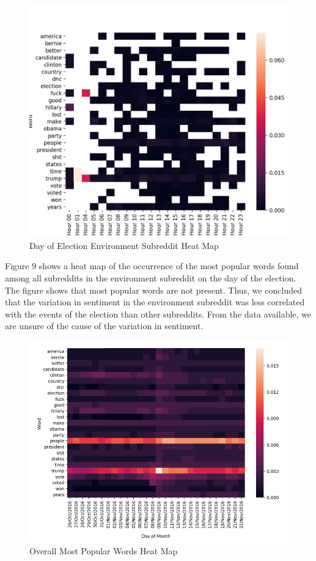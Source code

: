 \documentclass[letterpaper]{article}
\begin{document}
\begin{figure}[!htb]
\begin{center}
\includegraphics[scale=0.4]{day-of-election-environment.png}
\caption{Day of Election Environment Subreddit Heat Map}
\label{fig1}
\end{center}
\end{figure}

Figure $9$ shows a heat map of the occurrence of the most popular words found among all subreddits in the environment subreddit on the day of the election. The figure shows that most popular words are not present. Thus, we concluded that the variation in sentiment in the environment subreddit was less correlated with the events of the election than other subreddits. From the data available, we are unsure of the cause of the variation in sentiment.

\begin{figure}[!htb]
\begin{center}
\includegraphics[scale=0.3]{full-month-heatmap.png}
\caption{Overall Most Popular Words Heat Map}
\label{fig1}
\end{center}
\end{figure}
\end{document}
